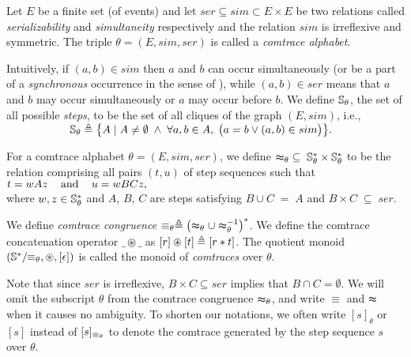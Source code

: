\documentclass{llncs}
\begin{document}
\begin{definition} Let $E$ be a finite set (of events) and let $ser \subseteq sim \subset E\times E$ be two relations called \emph{serializability} and \emph{simultaneity} respectively and the relation $sim$ is irreflexive and symmetric. The triple $\theta = (E,sim,ser)$ is called a \emph{comtrace alphabet}. \EOD
\label{def:comalpha}
\end{definition}

Intuitively, if $(a,b)\in sim$ then $a$ and $b$ can occur simultaneously
(or be a part of a {\em synchronous} occurrence in the sense of \cite{JLM06}),
while $(a,b)\in ser$ means that $a$ and $b$ may occur simultaneously
or $a$ may occur before $b$. We define $\mathbb{S}_\theta$, the set of all possible {\em steps},
 to be the set of all cliques of
the graph $(E,sim)$, i.e.,\\
$\mbox{\hspace{2cm}}\mathbb{S}_{\theta} \triangleq \bigl\{ A \mid A\neq\emptyset \;\wedge\; \forall a,b\in A,\; \bigl(a=b \vee (a,b)\in sim\bigr)\bigr\}.$

\begin{definition}
For a comtrace alphabet $\theta=(E,sim,ser)$, we define $\thickapprox_{\theta}\;\subseteq\; \mathbb{S}_{\theta}^*\times\mathbb{S}_{\theta}^*$ to be the relation comprising all pairs $(t,u)$ of step sequences such that \smallskip\\
$t=wAz\hspace*{3mm}\text{ and }\hspace*{3mm} u=wBCz,$\smallskip\\
where $w,z\in\mathbb{S}_{\theta}^*$ and $A$, $B$, $C$ are steps satisfying $B\cup C \;= \;A$ and $B\times C\;\subseteq\; ser$. 

We define \emph{comtrace congruence} $\equiv_{\theta}\triangleq \left(\thickapprox_{\theta}\cup\thickapprox^{-1}_{\theta}\right)^*$. We define the comtrace concatenation operator $\_\circledast\_$ as $[r]\circledast[t] \triangleq [r\ast t]$. The quotient monoid $(\mathbb{S}^*/\!\!\equiv_{\theta},\circledast,[\epsilon])$ is called the monoid of {\em comtraces} over $\theta$. \EOD
\label{def:commonoid}
\end{definition}

Note that since $ser$ is irreflexive, $B\times C\subseteq ser$ implies that $B\cap C=\emptyset$. We will omit the subscript $\theta$ from the comtrace congruence $\thickapprox_{\theta}$, and write $\equiv$ and $\thickapprox$ when it causes no ambiguity. To shorten our notations, we often write $[s]_{\theta}$ or $[s]$ instead of $[s]_{\equiv_{\theta}}$ to denote the comtrace generated by the step sequence $s$ over $\theta$.
\end{document}
